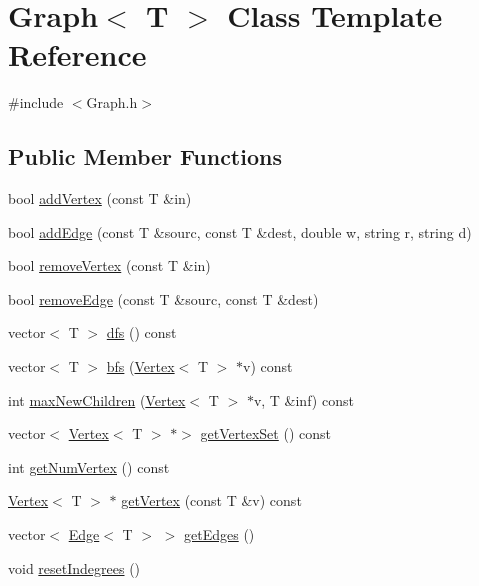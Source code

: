 \hypertarget{class_graph}{}\section{Graph$<$ T $>$ Class Template Reference}
\label{class_graph}


{\ttfamily \#include $<$Graph.\+h$>$}

\subsection*{Public Member Functions}
\begin{DoxyCompactItemize}
\item 
bool \hyperlink{class_graph_a00be284ea2be3b3d0f0d2e493b70245b}{add\+Vertex} (const T \&in)
\item 
bool \hyperlink{class_graph_ad7d2d102d0b5e91345d69766e1adcd19}{add\+Edge} (const T \&sourc, const T \&dest, double w, string r, string d)
\item 
bool \hyperlink{class_graph_af9c903104ad69a7782979fa9caedf163}{remove\+Vertex} (const T \&in)
\item 
bool \hyperlink{class_graph_a1106092a37366486cf55576f9ec01692}{remove\+Edge} (const T \&sourc, const T \&dest)
\item 
vector$<$ T $>$ \hyperlink{class_graph_a911798b1a89f8c4ae90ba3eee849cff8}{dfs} () const
\item 
vector$<$ T $>$ \hyperlink{class_graph_a56a5ea2c3aa7c0bd3849849be404a631}{bfs} (\hyperlink{class_vertex}{Vertex}$<$ T $>$ $\ast$v) const
\item 
int \hyperlink{class_graph_a675559f8cddfe43bc416023ad9f28cfa}{max\+New\+Children} (\hyperlink{class_vertex}{Vertex}$<$ T $>$ $\ast$v, T \&inf) const
\item 
vector$<$ \hyperlink{class_vertex}{Vertex}$<$ T $>$ $\ast$$>$ \hyperlink{class_graph_a135e8f915af85904abca9eafaa4f13ce}{get\+Vertex\+Set} () const
\item 
int \hyperlink{class_graph_a0853eac15cdf0f06d63f4b8a7820ec71}{get\+Num\+Vertex} () const
\item 
\hyperlink{class_vertex}{Vertex}$<$ T $>$ $\ast$ \hyperlink{class_graph_a67453d232f04e85c642b51554df1bc6a}{get\+Vertex} (const T \&v) const
\item 
vector$<$ \hyperlink{class_edge}{Edge}$<$ T $>$ $>$ \hyperlink{class_graph_a92ccadde8c981252b715147a33b9dcb1}{get\+Edges} ()
\item 
void \hyperlink{class_graph_af34eb86d804272e6e3e221a9ed688c53}{reset\+Indegrees} ()
$$
\end{DoxyCompactItemize}

